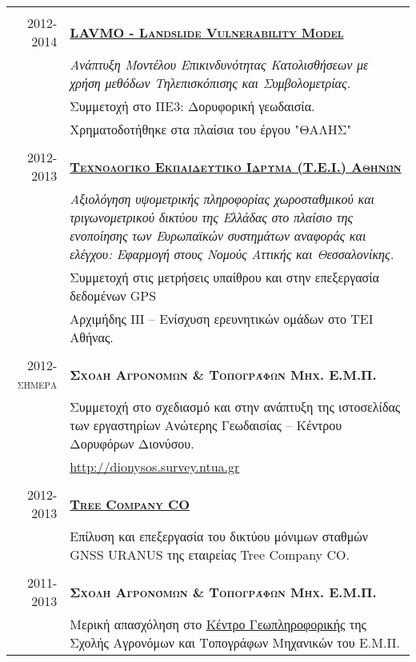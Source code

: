 \documentclass[a4paper,10pt]{article} %
\begin{document}
\begin{longtable}{r|p{13cm}}
\multicolumn{2}{c}{} \\ 
\textsc{2012-2014} & \textbf{\textsc{\href{http://excellence.minedu.gov.gr/thales/en/thalesprojects/379347}{LAVMO - Landslide Vulnerability Model}}}\\
  & \textit{Ανάπτυξη Μοντέλου Επικινδυνότητας Κατολισθήσεων με χρήση μεθόδων Τηλεπισκόπισης και Συμβολομετρίας.}\\
  & Συμμετοχή στο ΠΕ3: Δορυφορική γεωδαισία.\\
  & Χρηματοδοτήθηκε στα πλαίσια του έργου "ΘΑΛΗΣ"\\

\multicolumn{2}{c}{} \\
\textsc{2012-2013} & \textbf{\textsc{\href{http://www.teiath.gr/?lang=en}{Τεχνολογικό Εκπαιδευτικό Ίδρυμα (Τ.Ε.Ι.) Αθηνών}}}\\
  & \textit{Αξιολόγηση υψομετρικής πληροφορίας χωροσταθμικού και τριγωνομετρικού δικτύου της Ελλάδας στο πλαίσιο της ενοποίησης των Ευρωπαϊκών συστημάτων αναφοράς και ελέγχου: Εφαρμογή στους Νομούς Αττικής και Θεσσαλονίκης.}\\
  & Συμμετοχή στις μετρήσεις υπαίθρου και στην επεξεργασία δεδομένων GPS\\
  & Αρχιμήδης ΙΙΙ – Ενίσχυση ερευνητικών ομάδων στο ΤΕΙ Αθήνας.\\

\multicolumn{2}{c}{} \\
\textsc{2012-σήμερα} & \textbf{\textsc{Σχολή Αγρονόμων \& Τοπογράφων Μηχ. Ε.Μ.Π.}}\\
  & Συμμετοχή στο σχεδιασμό και στην ανάπτυξη της ιστοσελίδας των εργαστηρίων Ανώτερης Γεωδαισίας – Κέντρου Δορυφόρων Διονύσου.\\
  & \url{http://dionysos.survey.ntua.gr}\\

\multicolumn{2}{c}{} \\
\textsc{2012-2013} & \textbf{\textsc{\href{http://www.treecomp.gr/}{Tree Company CO}}}\\
  & Επίλυση και επεξεργασία του δικτύου μόνιμων σταθμών GNSS URANUS της εταιρείας Tree Company CO.\\

\multicolumn{2}{c}{} \\
\textsc{2011-2013} & \textbf{\textsc{Σχολή Αγρονόμων \& Τοπογράφων Μηχ. Ε.Μ.Π.}}\\
  & Μερική απασχόληση στο \href{http://portal.survey.ntua.gr/main/geocenter/geocen-g.html}{Κέντρο Γεωπληροφορικής} της Σχολής Αγρονόμων και Τοπογράφων Μηχανικών του Ε.Μ.Π.\\


\end{longtable}
\end{document}
